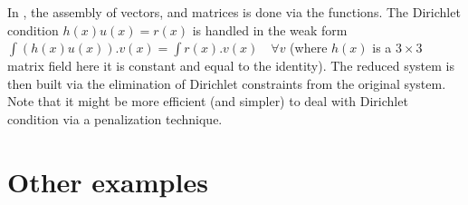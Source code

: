 \documentclass[a4paper,11pt,english]{sphinxmanual}
\begin{document}
In , the assembly of vectors, and matrices is done via the 
functions. The Dirichlet condition \(h(x)u(x) = r(x)\) is handled in the
weak form \(\int (h(x)u(x)).v(x) = \int r(x).v(x)\quad\forall v\) (where
\(h(x)\) is a \(3\times 3\) matrix field \textendash{} here it is constant and
equal to the identity). The reduced system  is then built via the
elimination of Dirichlet constraints from the original system. Note that it
might be more efficient (and simpler) to deal with Dirichlet condition via a
penalization technique.


\section{Other examples}
\end{document}
